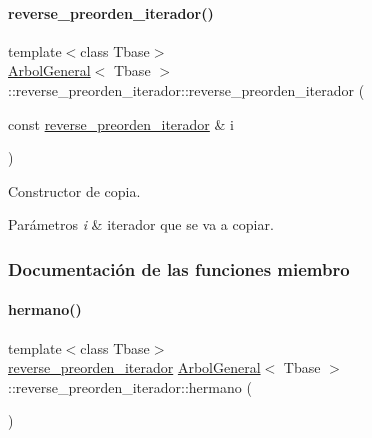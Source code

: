 \paragraph{\texorpdfstring{reverse\+\_\+preorden\+\_\+iterador()}{reverse\_preorden\_iterador()}\hspace{0.1cm}{\footnotesize\ttfamily [3/3]}}
{\footnotesize\ttfamily template$<$class Tbase$>$ \\
\hyperlink{classArbolGeneral}{Arbol\+General}$<$ Tbase $>$\+::reverse\+\_\+preorden\+\_\+iterador\+::reverse\+\_\+preorden\+\_\+iterador (\begin{DoxyParamCaption}\item[{const \hyperlink{classArbolGeneral_1_1reverse__preorden__iterador}{reverse\+\_\+preorden\+\_\+iterador} \&}]{i }\end{DoxyParamCaption})\hspace{0.3cm}{\ttfamily [inline]}}



Constructor de copia. 


\begin{DoxyParams}{Parámetros}
{\em i} & iterador que se va a copiar. \\
\hline
\end{DoxyParams}


\subsubsection{Documentación de las funciones miembro}
\hypertarget{classArbolGeneral_1_1reverse__preorden__iterador_a6af3b59622656609904b308c7b5532b4}{}\label{classArbolGeneral_1_1reverse__preorden__iterador_a6af3b59622656609904b308c7b5532b4} 
\paragraph{\texorpdfstring{hermano()}{hermano()}}
{\footnotesize\ttfamily template$<$class Tbase$>$ \\
\hyperlink{classArbolGeneral_1_1reverse__preorden__iterador}{reverse\+\_\+preorden\+\_\+iterador} \hyperlink{classArbolGeneral}{Arbol\+General}$<$ Tbase $>$\+::reverse\+\_\+preorden\+\_\+iterador\+::hermano (\begin{DoxyParamCaption}{ }\end{DoxyParamCaption})\hspace{0.3cm}{\ttfamily [inline]}}



